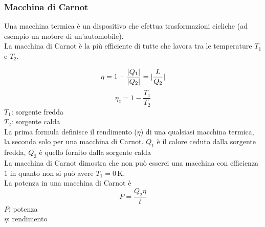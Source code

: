 \subsubsection{Macchina di Carnot}
Una macchina termica è un dispositivo che efettua trasformazioni cicliche (ad esempio un motore
di un'automobile).\\
La macchina di Carnot è la più efficiente di tutte che lavora tra le temperature $T_1$ e $T_2$.
\begin{center}
\end{center}
\begin{equation*}
  \eta = 1-\frac{\lvert Q_1\rvert}{\lvert Q_2\rvert} = \lvert\frac{L}{Q_2}\rvert
\end{equation*}
\begin{equation*}
  \eta_c = 1 - \frac{T_1}{T_2}
\end{equation*}
$T_1$: sorgente fredda\\
$T_2$: sorgente calda\\ [\baselineskip]
La prima formula definisce il rendimento ($\eta$) di una qualsiasi macchina termica, la seconda solo
per una macchina di Carnot. $Q_1$ è il calore ceduto dalla sorgente fredda, $Q_2$ è quello fornito 
dalla sorgente calda\\
La macchina di Carnot dimostra che non può esserci una macchina con efficienza $1$ in quanto non
si può avere $T_1 = 0\,\text{K}$.\\ [\baselineskip]
La potenza in una macchina di Carnot è
\begin{equation*}
  P = \frac{Q_2\eta}{t} 
\end{equation*}
$P$: potenza\\
$\eta$: rendimento

